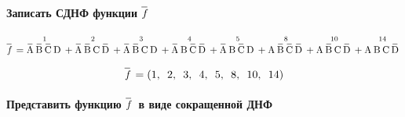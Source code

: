 \documentclass[a4paper, 14pt]{extarticle}
\begin{document}
\vspace{10pt}

\paragraph{Записать СДНФ функции $\OV{\itshape f}$}

\begin{equation*}
  \OV{\itshape f} = \overset{1}{\OV{A}\OV{B}\OV{C}\NOV{D}} + \overset{2}{\OV{A}\OV{B}\NOV{C}\OV{D}} + 
  \overset{3}{\OV{A}\OV{B}\NOV{C}\NOV{D}} + \overset{4}{\OV{A}\NOV{B}\OV{C}\OV{D}} + 
  \overset{5}{\OV{A}\NOV{B}\OV{C}\NOV{D}} + \overset{8}{\NOV{A}\OV{B}\OV{C}\OV{D}} + 
  \overset{10}{\NOV{A}\OV{B}\NOV{C}\OV{D}} + \overset{14}{\NOV{A}\NOV{B}\NOV{C}\OV{D}}
\end{equation*}

\begin{equation*}
  \OV{\itshape f} = \left(1,\hspace{5pt} 2,\hspace{5pt} 3,\hspace{5pt} 4,\hspace{5pt} 5,
  \hspace{5pt} 8,\hspace{5pt} 10,\hspace{5pt} 14\right)
\end{equation*}

\vspace{10pt}

\newpage

\paragraph{Представить функцию $\OV{\itshape f}$ в виде сокращенной ДНФ}
\end{document}

